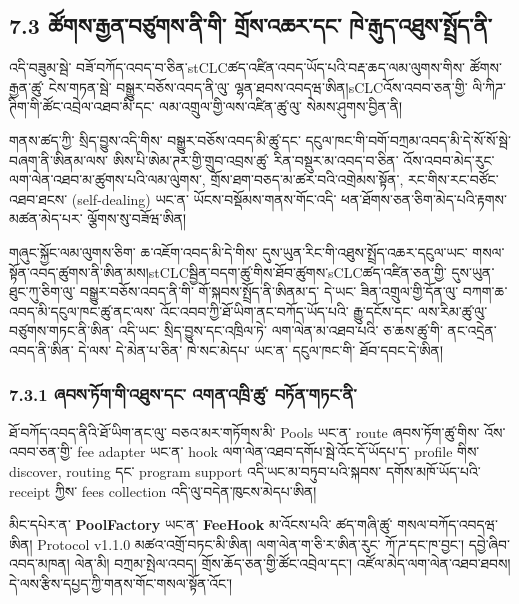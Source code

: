 \documentclass[11pt]{article}
\begin{document}
\subsection*{7.3 ཚོགས་རྒྱན་བཙུགས་ནི་གི་ གྲོས་འཆར་དང་ ཁེ་རྒུད་འཐུས་སྤྲོད་ནི་}

འདི་བཟུམ་སྦེ་ བཟོ་བཀོད་འབད་བ་ཅིན་stCLCཚད་འཛིན་འབད་ཡོད་པའི་བརྡ་ཆད་ལམ་ལུགས་གིས་ ཚོགས་རྒྱན་ཚུ་ ངེས་གཏན་སྦེ་ བསྒྱུར་བཅོས་འབད་ནི་ལུ་ ལྷན་ཐབས་འབདཝ་ཨིན།sCLCའོས་འབབ་ཅན་གྱི་ ལི་ཀིཌ་ཊིག་གི་ཚོང་འབྲེལ་འཐབ་མི་དང་ ལམ་འགྲུལ་གྱི་ལས་འཛིན་ཚུ་ལུ་ སེམས་ཤུགས་བྱིན་ནི།

གནས་ཚད་ཀྱི་ སྲིད་བྱུས་འདི་གིས་ བསྒྱུར་བཅོས་འབད་མི་ཚུ་དང་ དངུལ་ཁང་གི་བགོ་བཀྲམ་འབད་མི་དེ་སོ་སོ་སྦེ་བཞག་ནི་ཨིནམ་ལས་ ཨིས་པི་ཨེམ་ཊར་གྱི་གྲུབ་འབྲས་ཚུ་ རིན་བསྡུར་མ་འབད་བ་ཅིན་ འོས་འབབ་མེད་རུང་ ལག་ལེན་འཐབ་མ་ཚུགས་པའི་ལམ་ལུགས་, གྲོས་ཐག་བཅད་མ་ཚར་བའི་འགྲེམས་སྟོན་, རང་གིས་རང་བཙོང་འཐབ་ཐངས་ (self-dealing) ཡང་ན་ ཡོངས་བསྡོམས་གནས་གོང་འདི་ ཕན་ཐོགས་ཅན་ཅིག་མེད་པའི་རྟགས་མཚན་མེད་པར་ ལྕོགས་སུ་བཟོཝ་ཨིན།

གཞུང་སྐྱོང་ལམ་ལུགས་ཅིག་ ཆ་འཇོག་འབད་མི་དེ་གིས་ དུས་ཡུན་རིང་གི་འཐུས་སྤྲོད་འཆར་དངུལ་ཡང་ གསལ་སྟོན་འབད་ཚུགས་ནི་ཨིན་མས།stCLCསྦྱིན་བདག་ཚུ་གིས་ཐོབ་ཚུགས་sCLCཚད་འཛིན་ཅན་གྱི་ དུས་ཡུན་ཐུང་ཀུ་ཅིག་ལུ་ བསྒྱུར་བཅོས་འབད་ནི་གི་ གོ་སྐབས་སྤྲོད་ནི་ཨིནམ་ད་ དེ་ཡང་ ཟིན་འགྲུལ་གྱི་དོན་ལུ་ བཀག་ཆ་འབད་མི་དངུལ་ཁང་ཚུ་ནང་ལས་ འོང་འབབ་ཀྱི་ཐོ་ཡིག་ནང་བཀོད་ཡོད་པའི་ རྒྱུ་དངོས་དང་ ལས་རིམ་ཚུ་ལུ་ བཙུགས་གཏང་ནི་ཨིན་ འདི་ཡང་ སྲིད་བྱུས་དང་འཁྲིལ་ཏེ་ ལག་ལེན་མ་འཐབ་པའི་ ཅ་ཆས་ཚུ་གི་ ནང་འདྲེན་འབད་ནི་ཨིན་ དེ་ལས་ དེ་མེན་པ་ཅིན་ ཁེ་སང་མེདཔ་ ཡང་ན་ དངུལ་ཁང་གི་ ཐོབ་དབང་དེ་ཨིན།

\subsubsection*{7.3.1 ཞབས་ཏོག་གི་འཐུས་དང་ འགན་འཁྲི་ཚུ་ བཏོན་གཏང་ནི་}

ཐོ་བཀོད་འབད་ནིའི་ཐོ་ཡིག་ནང་ལུ་ བཅའ་མར་གཏོགས་མི་ Pools ཡང་ན་ route ཞབས་ཏོག་ཚུ་གིས་ འོས་འབབ་ཅན་གྱི་ fee adapter ཡང་ན་ hook ལག་ལེན་འཐབ་དགོཔ་སྦེ་འོང་དོ་ཡོདཔ་ད་ profile གིས་ discover, routing དང་ program support འདི་ཡང་མ་བཏུབ་པའི་སྐབས་ དགོས་མཁོ་ཡོད་པའི་ receipt ཀྱིས་ fees collection འདི་ལུ་བདེན་ཁུངས་མེདཔ་ཨིན།

མིང་དཔེར་ན་ \textbf{PoolFactory } ཡང་ན་ \textbf{ FeeHook} མ་འོངས་པའི་ ཚད་གཞི་ཚུ་ གསལ་བཀོད་འབདཝ་ཨིན། Protocol v1.1.0 མཚའ་འགྲོ་བཏང་མི་ཨིན། ལག་ལེན་ག་ཅི་ར་ཨིན་རུང་ ཀོ་ཌ་དང་ཁ་བྱང་། དབྱེ་ཞིབ་འབད་མཁན། ལེན་མི། བཀྲམ་སྤེལ་འབད། གྲོས་ཆོད་ཅན་གྱི་ཚོང་འབྲེལ་དང་། འཛོལ་མེད་ལག་ལེན་འཐབ་ཐབས། དེ་ལས་རྩིས་དཔྱད་ཀྱི་གནས་གོང་གསལ་སྟོན་འོང་།
\end{document}
